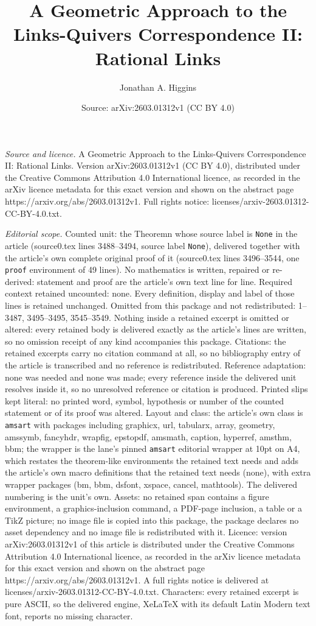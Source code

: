 \documentclass[10pt,a4paper]{amsart}
\title[A Geometric Approach to the Links-Quivers Correspondence II:]{A Geometric Approach to the Links-Quivers Correspondence II: Rational Links}
\author{Jonathan A. Higgins}
\date{Source: arXiv:2603.01312v1 (CC BY 4.0)}
\begin{document}
\maketitle

\noindent\emph{Source and licence.} A Geometric Approach to the Links-Quivers Correspondence II: Rational Links. Version arXiv:2603.01312v1 (CC BY 4.0), distributed under the Creative Commons Attribution 4.0 International licence, as recorded in the arXiv licence metadata for this exact version and shown on the abstract page https://arxiv.org/abs/2603.01312v1. Full rights notice: licenses/arxiv-2603.01312-CC-BY-4.0.txt.\par\smallskip

\noindent\textit{Editorial scope.} Counted unit: the Theoremn whose source label is \texttt{None} in the article (source0.tex lines 3488--3494, source label \texttt{None}), delivered together with the article's own complete original proof of it (source0.tex lines 3496--3544, one \texttt{proof} environment of 49 lines). No mathematics is written, repaired or re-derived: statement and proof are the article's own text line for line. Required context retained uncounted: none. Every definition, display and label of those lines is retained unchanged. Omitted from this package and not redistributed: 1--3487, 3495--3495, 3545--3549. Nothing inside a retained excerpt is omitted or altered: every retained body is delivered exactly as the article's lines are written, so no omission receipt of any kind accompanies this package. Citations: the retained excerpts carry no citation command at all, so no bibliography entry of the article is transcribed and no reference is redistributed. Reference adaptation: none was needed and none was made; every reference inside the delivered unit resolves inside it, so no unresolved reference or citation is produced. Printed slips kept literal: no printed word, symbol, hypothesis or number of the counted statement or of its proof was altered. Layout and class: the article's own class is \texttt{amsart} with packages including graphicx, url, tabularx, array, geometry, amssymb, fancyhdr, wrapfig, epstopdf, amsmath, caption, hyperref, amsthm, bbm; the wrapper is the lane's pinned \texttt{amsart} editorial wrapper at 10pt on A4, which restates the theorem-like environments the retained text needs and adds the article's own macro definitions that the retained text needs (none), with extra wrapper packages (bm, bbm, dsfont, xspace, cancel, mathtools). The delivered numbering is the unit's own. Assets: no retained span contains a figure environment, a graphics-inclusion command, a PDF-page inclusion, a table or a TikZ picture; no image file is copied into this package, the package declares no asset dependency and no image file is redistributed with it. Licence: version arXiv:2603.01312v1 of this article is distributed under the Creative Commons Attribution 4.0 International licence, as recorded in the arXiv licence metadata for this exact version and shown on the abstract page https://arxiv.org/abs/2603.01312v1. A full rights notice is delivered at licenses/arxiv-2603.01312-CC-BY-4.0.txt. Characters: every retained excerpt is pure ASCII, so the delivered engine, XeLaTeX with its default Latin Modern text font, reports no missing character.
\end{document}
